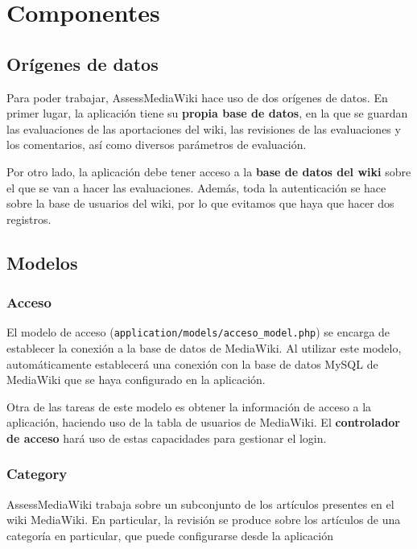 \documentclass[11pt]{article}
\begin{document}

\section{Componentes }

\subsection{Orígenes de datos}

Para poder trabajar, AssessMediaWiki hace uso de dos orígenes de datos. En
primer lugar, la aplicación tiene su \textbf{propia base de datos}, en la que se
guardan las evaluaciones de las aportaciones del wiki, las revisiones de las
evaluaciones y los comentarios, así como diversos parámetros de evaluación.

Por otro lado, la aplicación debe tener acceso a la \textbf{base de datos del
  wiki} sobre el que se van a hacer las evaluaciones. Además, toda la
autenticación se hace sobre la base de usuarios del wiki, por lo que evitamos
que haya que hacer dos registros.

\subsection{Modelos}

\subsubsection{Acceso}

El modelo de acceso (\texttt{application/models/acceso\_model.php}) se encarga de
establecer la conexión a la base de datos de MediaWiki. Al utilizar este modelo,
automáticamente establecerá una conexión con la base de datos MySQL de MediaWiki
que se haya configurado en la aplicación.

Otra de las tareas de este modelo es obtener la información de acceso a la
aplicación, haciendo uso de la tabla de usuarios de MediaWiki. El
\textbf{controlador de acceso} hará uso de estas capacidades para gestionar el
login.

\subsubsection{Category}

AssessMediaWiki trabaja sobre un subconjunto de los artículos presentes en el
wiki MediaWiki. En particular, la revisión se produce sobre los artículos de una
categoría en particular, que puede configurarse desde la aplicación
\end{document}
